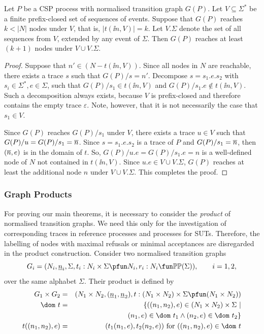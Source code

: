 \begin{lemma}
\label{lemma:extendV} Let $P$ be a CSP process with normalised transition
graph $G(P)$. %
Let
$V\subseteq\Sigma^*$ be a finite prefix-closed set of sequences of events.
Suppose that  $G(P)$ reaches $k < |N|$ nodes under $V$, that is, $|t(\ii
n,V)| = k$. Let $V.\Sigma$ denote the set of all sequences from $V$, extended
by any event of $\Sigma$. Then $G(P)$ reaches at least $(k+1)$ nodes under
$V\cup V.\Sigma$.
\end{lemma}
\begin{proof}
Suppose that $n'\in (N - t(\ii n,V))$.  Since all nodes in $N$ are reachable,
there exists a trace $s$ such that $G(P)/s = n'$. Decompose $s = s_1.e.s_2$
with $s_i\in\Sigma^*, e\in\Sigma$, such that $G(P)/s_1 \in t(\ii n,V)$ and
$G(P)/s_1.e \not\in t(\ii n,V)$. Such a decomposition always exists, because
$V$ is prefix-closed and therefore contains the empty trace $\varepsilon$.
Note, however, that it is not necessarily the case that $s_1\in V$.

Since $G(P)$ reaches $G(P)/s_1$ under $V$, there exists a trace $u\in V$ such
that $G(P)/u = G(P)/s_1 = \overline n$. Since $s = s_1.e.s_2$ is a trace of $P$ and
$G(P)/s_1 = \overline n$, then $(\overline n,e)$ is in the domain of $t$. So, $ G(P)/u.e
= G(P)/s_1.e = n$ is a well-defined node of $N$ not contained in $t(\ii
n,V)$. Since $u.e\in V\cup V.\Sigma$, $G(P)$ reaches at least the additional
node $n$ under $V\cup V.\Sigma$. This completes the proof. \xbox
\end{proof}


\subsubsection*{Graph Products}
\label{sec:GP}


For proving our main theorems, it is necessary to consider the \emph{product}
of normalised transition graphs. We need this only for the investigation of
corresponding traces in reference processes and processes for SUTs.
Therefore, the labelling of nodes with maximal refusals or minimal
acceptances are disregarded in the product construction. Consider two
normalised transition graphs
\[
G_i = ( N_i, \ii n_i, \Sigma, t_i : N_i\times\Sigma \pfun N_i, r_i : N_i \fun \mathbb{P}\mathbb{P}(\Sigma)),\qquad i = 1,2,
\]
over the same alphabet $\Sigma$. Their product is defined by
\begin{eqnarray}
G_1\times G_2 & = & (N_1\times N_2,(\ii n_1,\ii n_2), t:(N_1\times N_2)\times\Sigma\pfun (N_1\times N_2))
\\
\dom~t & = & \{ ((n_1,n_2),e)\in (N_1\times N_2)\times\Sigma~|   \nonumber
\\ & & \tabc
(n_1,e)\in\dom~t_1\wedge
(n_2,e) \in\dom~t_2    \}
\\
t((n_1,n_2),e) & = & (t_1(n_1,e),t_2(n_2,e))\ \text{for $((n_1,n_2),e)\in\dom~t$}
\end{eqnarray}


